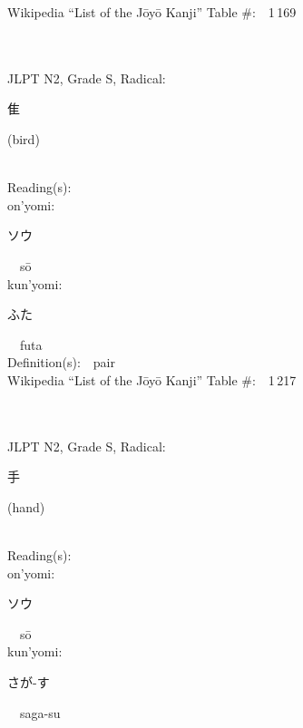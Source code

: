 \begin{multicols}{2}
Wikipedia ``List of the J\=oy\=o Kanji'' Table \#:\ \ 1\,169 \\
\ \ \\
{\fontsize{34pt}{40pt}  }\ \ \\  %
{JLPT N2, Grade S, Radical:\ \ {\begin{CJK}{UTF8}{min} 隹 \end{CJK}} (bird) } \\
Reading(s):\ \ \\
{\hspace*{1em}}on'yomi:\ \ \\
{\hspace*{2em}}{\begin{CJK}{UTF8}{min} ソウ \end{CJK}}\ \ s\=o\ \ \\
{\hspace*{1em}}kun'yomi:\ \ \\
{\hspace*{2em}}{\begin{CJK}{UTF8}{min} ふた \end{CJK}}\ \ futa\ \ \\
Definition(s):\ \ pair \\
Wikipedia ``List of the J\=oy\=o Kanji'' Table \#:\ \ 1\,217 \\
\ \ \\
{\fontsize{34pt}{40pt}  }\ \ \\  %
{JLPT N2, Grade S, Radical:\ \ {\begin{CJK}{UTF8}{min} 手 \end{CJK}} (hand) } \\
Reading(s):\ \ \\
{\hspace*{1em}}on'yomi:\ \ \\
{\hspace*{2em}}{\begin{CJK}{UTF8}{min} ソウ \end{CJK}}\ \ s\=o\ \ \\
{\hspace*{1em}}kun'yomi:\ \ \\
{\hspace*{2em}}{\begin{CJK}{UTF8}{min} さが-す \end{CJK}}\ \ saga-su\ \ \\

\end{multicols}
